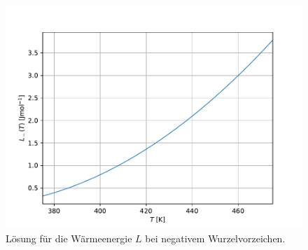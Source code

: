     \begin{figure}[H]
      \centering
      \includegraphics{plot3.pdf}
      \caption{Lösung für die Wärmeenergie $L$ bei negativem Wurzelvorzeichen.}
      \label{fig:L_-}
    \end{figure}
%
